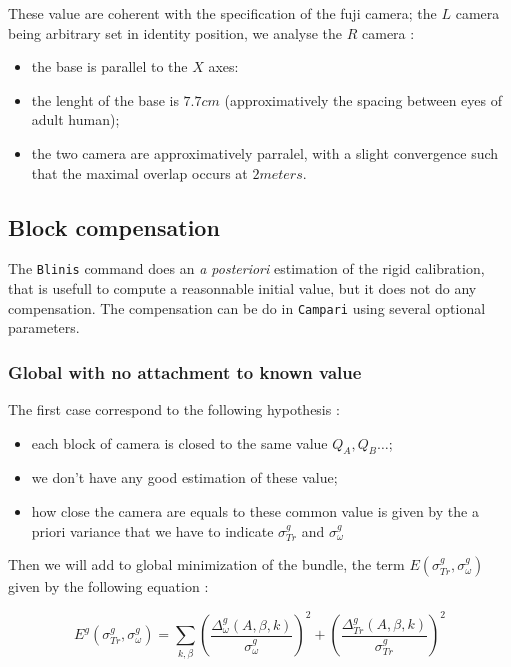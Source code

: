 These value are coherent with the specification of the fuji camera; the $L$ camera being arbitrary
set in identity position, we  analyse the $R$ camera :

\begin{itemize}
    \item the base is parallel to the $X$ axes:
    \item the lenght of the base is $7.7 cm$ (approximatively the spacing between eyes of adult human);
    \item the two camera are approximatively parralel, with a slight convergence such that the maximal overlap
          occurs at $2 meters$.
\end{itemize}



\subsection{Block compensation}

The {\tt Blinis} command does an \emph{a posteriori} estimation of the rigid calibration,
that is usefull to compute a reasonnable initial value, but it does not do any compensation.
The compensation can be do in {\tt Campari} using several optional parameters.

\subsubsection{Global with no attachment to known value }

The first case correspond to the following hypothesis :

\begin{itemize}
    \item each block of camera is closed to the same value $Q_A, Q_B \dots $;
    \item we don't have any good estimation of these value;
    \item how close the camera are equals to these common value is given by the a priori
          variance that we have to indicate  $\sigma^g_{Tr} $ and $\sigma^g_{\omega} $
\end{itemize}

Then we will add to global minimization of the bundle, the term $E(\sigma^g_{Tr},\sigma^g_{\omega})$
given by the following equation :

\begin{equation}
      E^g(\sigma^g_{Tr},\sigma^g_{\omega}) =
      \sum _{k,\beta}
      (\frac{\Delta^g_{\omega}(A,\beta,k)}{\sigma^g_{\omega}}) ^2
      +(\frac{\Delta^g_{Tr}(A,\beta,k)}{\sigma^g_{Tr}})^2
\end{equation}

